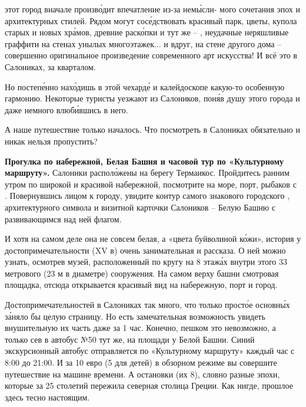  этот город вначале произв\'{о}дит  впечатление из-за нем\'{ы}сли- мого сочетания эпох и архитектурных стилей. Рядом могут сос\'{е}дствовать красивый парк, цветы, купола старых и новых хр\'{а}мов, древние раск\'{о}пки и тут же --  , неудачные неряшливые граффити на стенах унылых многоэтажек... и вдруг, на стене другого дома -- совершенно оригинальное произведение современного арт искусства! И всё это  в Салониках,  за кварталом.

Но постеп\'{е}нно нах\'{о}дишь в этой чехард\'{е} и калейдоскопе какую-то особенную гармонию. Некоторые туристы уезжают из Салоников, пон\'{я}в душу этого города и даже немного влюб\'{и}вшись в него.

А наше путешествие только началось. Что посмотреть в Салониках обязательно и никак нельзя пропустить?

\textbf{Прогулка по набережной, Белая Башня и часовой тур по «Культурному маршруту».}
Салоники распол\'{о}жены на берегу  Термаикос. Пройдитесь ранним утром по широкой и красивой набережной, посмотрите на море, порт, рыбаков с . Повернувшись лицом к городу, увидите контур самого знакового городского , архитектурного символа и визитной карточки Салоников -- Белую Башню с развивающимся над ней флагом.

И хотя на самом деле она не совсем белая, а «цвета буйволиной к\'{о}жи», история у достопримечательности (XV в) очень занимательная и   рассказа. О ней можно узнать, осмотрев музей, расположенный по кругу на 8 этаж\'{а}х внутри этого 33 метрового (23 м в диаметре)  сооружения. На самом верху башни смотровая площадка, отсюда открывается красивый вид на набережную, порт и город.

Достопримечательностей в Салониках так много, что только прост\'{о}е  основн\'{ы}х з\'{а}няло бы целую страницу. Но есть замечательная возможность увидеть внушительную их часть даже за 1 час. Конечно, пешком это невозможно, а только сев в автобус №50 тут же, на площади у Белой Башни. Синий экскурсионный автобус отправляется по «Культурному маршруту» каждый час с 8:00 до 21:00. И за 10 евро (5 для детей) в обзорном режиме вы совершите путешествие на машине времени. А остановки (их 8), словно разные эпохи, которые за 25 столетий пережила северная столица Греции. Как нигде, прошлое здесь тесно  настоящим.


